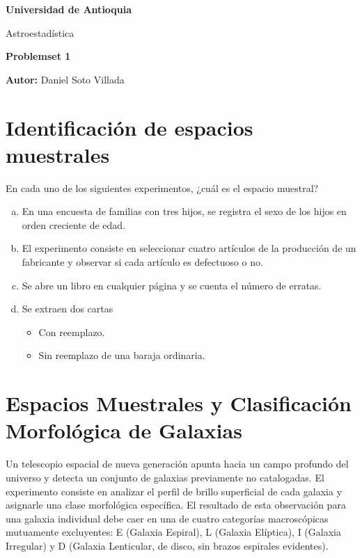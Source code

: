 \documentclass[a4paper]{article}
\begin{document}
\begin{center}
  {\Large\bfseries Universidad de Antioquia\par}
  \vspace{0.2cm}
  {\large Astroestadística\par}
  {\large\bfseries Problemset 1\par}
  \vspace{0.2cm}
  {\normalsize\textbf{Autor:} Daniel Soto Villada\par}
\end{center}

\vspace{0.5cm}

\clearpage
\tableofcontents

\section{Identificación de espacios muestrales}
\label{sec:problema-01}

En cada uno de los siguientes experimentos, ¿cuál es el espacio muestral?

\begin{enumerate}[a)]
    \item En una encuesta de familias con tres hijos, se registra el sexo de los hijos en orden creciente de edad.
    \item El experimento consiste en seleccionar cuatro artículos de la producción de un fabricante y observar si cada artículo es defectuoso o no.
    \item Se abre un libro en cualquier página y se cuenta el número de erratas.
    \item Se extraen dos cartas 
    \begin{itemize} 
    	\item Con reemplazo.
    	\item Sin reemplazo de una baraja ordinaria.
    \end{itemize}
\end{enumerate}

\section{Espacios Muestrales y Clasificación Morfológica de Galaxias}
\label{sec:problema-02}

Un telescopio espacial de nueva generación apunta hacia un campo profundo del universo y detecta un conjunto de galaxias previamente no catalogadas. El experimento consiste en analizar el perfil de brillo superficial de cada galaxia y asignarle una clase morfológica específica. El resultado de esta observación para una galaxia individual debe caer en una de cuatro categorías macroscópicas mutuamente excluyentes: E (Galaxia Espiral), L (Galaxia Elíptica), I (Galaxia Irregular) y D (Galaxia Lenticular, de disco, sin brazos espirales evidentes).
\end{document}
